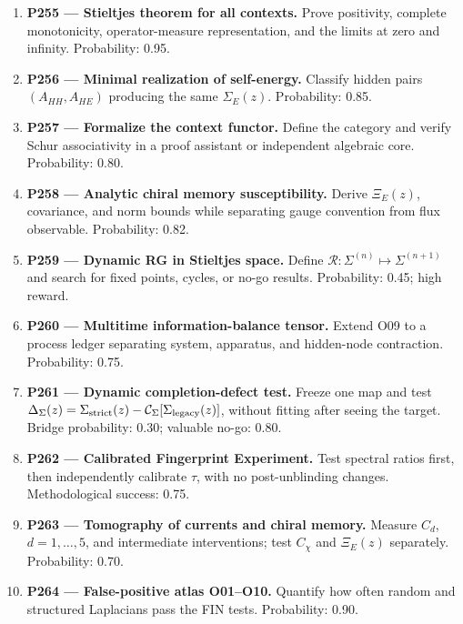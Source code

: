 \documentclass[11pt,a4paper,openany]{report}
\begin{document}
\begin{enumerate}
\item 
\textbf{P255 --- Stieltjes theorem for all contexts.} Prove positivity, complete monotonicity, operator-measure representation, and the limits at zero and infinity. Probability: 0.95.

\item 
\textbf{P256 --- Minimal realization of self-energy.} Classify hidden pairs \((A_{HH},A_{HE})\) producing the same \(\Sigma_E(z)\). Probability: 0.85.

\item 
\textbf{P257 --- Formalize the context functor.} Define the category and verify Schur associativity in a proof assistant or independent algebraic core. Probability: 0.80.

\item 
\textbf{P258 --- Analytic chiral memory susceptibility.} Derive \(\Xi_E(z)\), covariance, and norm bounds while separating gauge convention from flux observable. Probability: 0.82.

\item 
\textbf{P259 --- Dynamic RG in Stieltjes space.} Define \(\mathcal R:\Sigma^{(n)}\mapsto\Sigma^{(n+1)}\) and search for fixed points, cycles, or no-go results. Probability: 0.45; high reward.

\item 
\textbf{P260 --- Multitime information-balance tensor.} Extend O09 to a process ledger separating system, apparatus, and hidden-node contraction. Probability: 0.75.

\item 
\textbf{P261 --- Dynamic completion-defect test.} Freeze one map and test \(\Delta_\Sigma(z)=\Sigma_{\rm strict}(z)-
   \mathcal C_\Sigma[\Sigma_{\rm legacy}(z)]\), without fitting after seeing the target. Bridge probability: 0.30; valuable no-go: 0.80.

\item 
\textbf{P262 --- Calibrated Fingerprint Experiment.} Test spectral ratios first, then independently calibrate \(\tau\), with no post-unblinding changes. Methodological success: 0.75.

\item 
\textbf{P263 --- Tomography of currents and chiral memory.} Measure \(C_d\), \(d=1,\ldots,5\), and intermediate interventions; test \(C_\chi\) and \(\Xi_E(z)\) separately. Probability: 0.70.

\item 
\textbf{P264 --- False-positive atlas O01--O10.} Quantify how often random and structured Laplacians pass the FIN tests. Probability: 0.90.


\end{enumerate}
\end{document}

